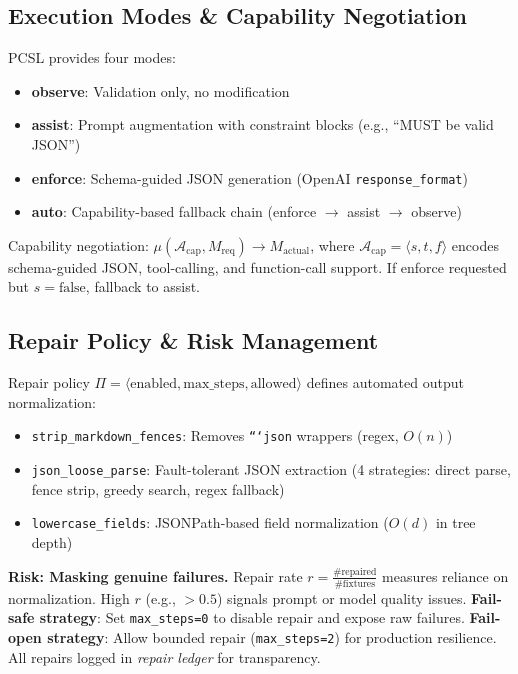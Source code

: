 \documentclass[sigconf]{acmart}
\begin{document}
\subsection{Execution Modes \& Capability Negotiation}

PCSL provides four modes:
\begin{itemize}
\item \textbf{observe}: Validation only, no modification
\item \textbf{assist}: Prompt augmentation with constraint blocks (e.g., ``MUST be valid JSON'')
\item \textbf{enforce}: Schema-guided JSON generation (OpenAI \texttt{response\_format})
\item \textbf{auto}: Capability-based fallback chain (enforce \(\to\) assist \(\to\) observe)
\end{itemize}

Capability negotiation: \( \mu(\mathcal{A}_{\text{cap}}, M_{\text{req}}) \to M_{\text{actual}} \), where \( \mathcal{A}_{\text{cap}} = \langle s, t, f \rangle \) encodes schema-guided JSON, tool-calling, and function-call support. If enforce requested but \( s = \text{false} \), fallback to assist.

\subsection{Repair Policy \& Risk Management}

Repair policy \( \Pi = \langle \text{enabled}, \text{max\_steps}, \text{allowed} \rangle \) defines automated output normalization:
\begin{itemize}
\item \texttt{strip\_markdown\_fences}: Removes \texttt{```json} wrappers (regex, \( O(n) \))
\item \texttt{json\_loose\_parse}: Fault-tolerant JSON extraction (4 strategies: direct parse, fence strip, greedy search, regex fallback)
\item \texttt{lowercase\_fields}: JSONPath-based field normalization (\( O(d) \) in tree depth)
\end{itemize}

\textbf{Risk: Masking genuine failures.} Repair rate \( r = \frac{\text{\# repaired}}{\text{\# fixtures}} \) measures reliance on normalization. High \( r \) (e.g., \( > 0.5 \)) signals prompt or model quality issues. \textbf{Fail-safe strategy}: Set \texttt{max\_steps=0} to disable repair and expose raw failures. \textbf{Fail-open strategy}: Allow bounded repair (\texttt{max\_steps=2}) for production resilience. All repairs logged in \textit{repair ledger} for transparency.
\end{document}
